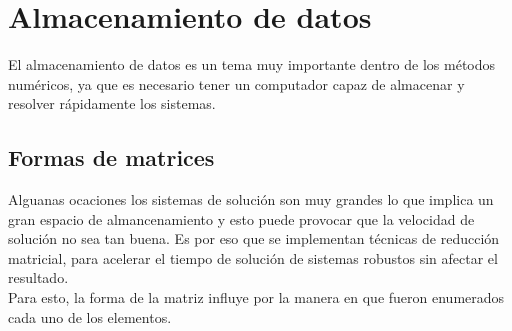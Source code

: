 \chapter{Almacenamiento de datos }
El almacenamiento de datos es un tema muy importante dentro de los m\'etodos num\'ericos, ya que es necesario tener un computador capaz de almacenar y resolver r\'apidamente los sistemas.

\section{Formas de matrices}
Alguanas ocaciones los sistemas de soluci\'on son muy grandes lo que implica un gran espacio de almancenamiento y esto puede provocar que la velocidad de soluci\'on no sea tan buena. Es por eso que se implementan t\'ecnicas de reducci\'on matricial, para acelerar el tiempo de soluci\'on de sistemas robustos sin afectar el resultado.\\
Para esto, la forma de la matriz influye por la manera en que fueron enumerados cada uno de los elementos.

